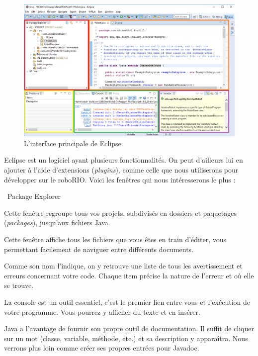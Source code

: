 \documentclass[12pt]{report}
\begin{document}
%
\begin{figure}[!htb]
  \centering
  \includegraphics[width=\textwidth]{interface-eclipse.png}
  \caption{L'interface principale de Eclipse.}
\end{figure}
%
Eclipse est un logiciel ayant plusieurs fonctionnalités. On peut d'ailleurs lui en ajouter à l'aide d'extensions (\emph{plugins}), comme celle que nous utiliserons pour développer sur le roboRIO. Voici les fenêtres qui nous intéresserons le plus :

\begin{labeling}{\ Package Explorer\ }
%
\item[\colorbox{ec-red}{\emph{Package Explorer}}] Cette fenêtre regroupe tous vos projets, subdivisés en dossiers et paquetages (\emph{packages}), jusqu'aux fichiers Java.
%
\item[\colorbox{ec-orange}{Fenêtre d'édition}] Cette fenêtre affiche tous les fichiers que vous êtes en train d'éditer, vous permettant facilement de naviguer entre différents documents.
%
\item[\colorbox{ec-yellow}{\emph{Problems}}] Comme son nom l'indique, on y retrouve une liste de tous les avertissement et erreurs concernant votre code. Chaque item précise la nature de l'erreur et où elle se trouve.
%
\item[\colorbox{ec-green}{Console}] La console est un outil essentiel, c'est le premier lien entre vous et l'exécution de votre programme. Vous pourrez y afficher du texte et en insérer.
%
\item[\colorbox{ec-purple}{Javadoc}] Java a l'avantage de fournir son propre outil de documentation. Il suffit de cliquer sur un mot (classe, variable, méthode, etc.) et sa description y apparaîtra. Nous verrons plus loin comme créer ses propres entrées pour Javadoc.
\end{labeling}
\end{document}
